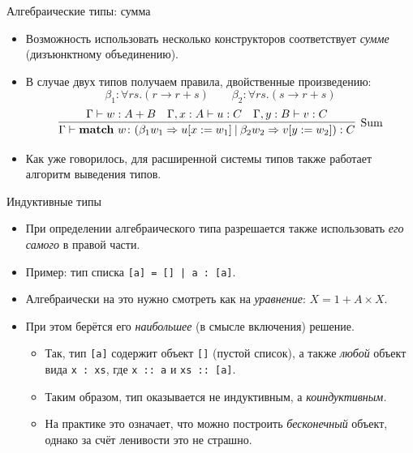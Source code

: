 \documentclass[xcolor=dvipsnames]{beamer}
\begin{document}
\begin{frame}{Алгебраические типы: сумма}
\begin{itemize}[<+->]
 \item Возможность использовать несколько конструкторов соответствует {\em сумме} (дизъюнктному объединению).
 \item В случае двух типов получаем правила, двойственные произведению:
 \[
  \beta_1 \colon \forall r s . (r \to r+s) \qquad
  \beta_2 \colon \forall r s . (s \to r+s)
 \]
 \[
  \infer[\mathrm{Sum}]
  {\Gamma \vdash \mathbf{match}\ w\colon  (\beta_1 w_1 \Rightarrow u[x:=w_1] \:|\: \beta_2 w_2 \Rightarrow v[y:=w_2]) : C}
  {\Gamma \vdash w : A + B & 
  \Gamma, x : A \vdash u : C & 
  \Gamma, y : B \vdash v : C}
 \]

\item Как уже говорилось, для расширенной системы типов также работает алгоритм выведения типов.
\end{itemize}
\end{frame}

\begin{frame}{Индуктивные типы}

\begin{itemize}[<+->]
 \item При определении алгебраического типа разрешается также использовать {\em его самого} в правой части.
 \item Пример: тип списка \texttt{[a] = [] | a : [a]}.
 \item Алгебраически на это нужно смотреть как на {\em уравнение}: 
 $X = 1 + A \times X$.
 \item При этом берётся его {\em наибольшее} (в смысле включения) решение.
 \begin{itemize}
 \item Так, тип \texttt{[a]} содержит объект \texttt{[]} (пустой список), а также {\em любой} объект вида \texttt{x : xs}, где \texttt{x :: a} и 
 \texttt{xs :: [a]}.
 \item Таким образом, тип оказывается не индуктивным, а {\em коиндуктивным.}
 \item На практике это означает, что можно построить {\em бесконечный} объект, однако за счёт ленивости это не страшно.
 \end{itemize}
\end{itemize}

 
 
\end{frame}
\end{document}
